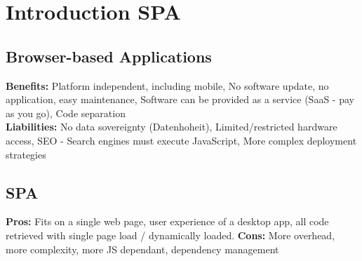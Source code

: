 
\section{Introduction SPA}
\subsection{Browser-based Applications}
\textbf{Benefits:} Platform independent, including mobile,
No software update, no application, easy maintenance, 
Software can be provided as a service (SaaS - pay as you go),
Code separation\\
\textbf{Liabilities:} No data sovereignty (Datenhoheit),
Limited/restricted hardware access,
SEO - Search engines must execute JavaScript,
More complex deployment strategies

\subsection{SPA}
\textbf{Pros:} Fits on a single web page, user experience of a desktop app, all code retrieved with single page load / dynamically loaded.
\textbf{Cons:} More overhead, more complexity, more JS dependant, dependency management